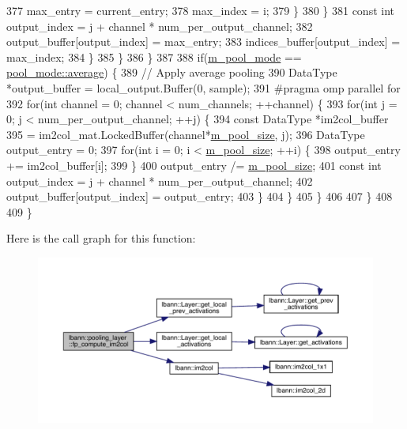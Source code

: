 \begin{DoxyCode}
377                 max\_entry = current\_entry;
378                 max\_index = i;
379               \}
380             \}
381             \textcolor{keyword}{const} \textcolor{keywordtype}{int} output\_index = j + channel * num\_per\_output\_channel;
382             output\_buffer[output\_index] = max\_entry;
383             indices\_buffer[output\_index] = max\_index;
384           \}
385         \}
386       \}
387 
388       \textcolor{keywordflow}{if}(\hyperlink{classlbann_1_1pooling__layer_a7b19407c88f89757e64ed3d4afab8443}{m\_pool\_mode} == \hyperlink{base_8hpp_ac47a6ee5278a53898222a48639a2bf39a6927a3a7218a3195858411433ec20a21}{pool\_mode::average}) \{
389         \textcolor{comment}{// Apply average pooling}
390         DataType *output\_buffer = local\_output.Buffer(0, sample);
391 \textcolor{preprocessor}{        #pragma omp parallel for}
392         \textcolor{keywordflow}{for}(\textcolor{keywordtype}{int} channel = 0; channel < num\_channels; ++channel) \{
393           \textcolor{keywordflow}{for}(\textcolor{keywordtype}{int} j = 0; j < num\_per\_output\_channel; ++j) \{
394             \textcolor{keyword}{const} DataType *im2col\_buffer
395               = im2col\_mat.LockedBuffer(channel*\hyperlink{classlbann_1_1pooling__layer_a8b3a9020bb896a1132c9823bc2c73515}{m\_pool\_size}, j);
396             DataType output\_entry = 0;
397             \textcolor{keywordflow}{for}(\textcolor{keywordtype}{int} i = 0; i < \hyperlink{classlbann_1_1pooling__layer_a8b3a9020bb896a1132c9823bc2c73515}{m\_pool\_size}; ++i) \{
398               output\_entry += im2col\_buffer[i];
399             \}
400             output\_entry /= \hyperlink{classlbann_1_1pooling__layer_a8b3a9020bb896a1132c9823bc2c73515}{m\_pool\_size};
401             \textcolor{keyword}{const} \textcolor{keywordtype}{int} output\_index = j + channel * num\_per\_output\_channel;
402             output\_buffer[output\_index] = output\_entry;
403           \}
404         \}
405       \}
406 
407     \}
408 
409   \}
\end{DoxyCode}
Here is the call graph for this function\+:\nopagebreak
\begin{figure}[H]
\begin{center}
\leavevmode
\includegraphics[width=350pt]{classlbann_1_1pooling__layer_a76ce07a190fbe85685ea2ab4e53be7f9_cgraph}
\end{center}
\end{figure}
